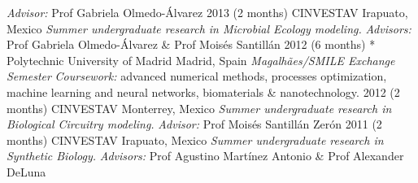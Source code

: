 \documentclass[]{friggeri-cv} %
\begin{document}
\begin{entrylist}
{\emph{Advisor:} Prof Gabriela Olmedo-Álvarez }%
\entry
{2013}
{(2 months)}
{CINVESTAV}
{Irapuato, Mexico}
{{\normalsize\emph{Summer undergraduate research in Microbial Ecology modeling.}}}
{\emph{Advisors:} Prof Gabriela Olmedo-Álvarez \& Prof Moisés Santillán }%
\entry
{2012}
{(6 months)}
{* Polytechnic University of Madrid}
{Madrid, Spain}
{{\normalsize\emph{Magalhães/SMILE Exchange Semester}}}
{\emph{Coursework:} advanced numerical methods, processes optimization, machine learning and neural networks, biomaterials \& nanotechnology.}
\entry
{2012}
{(2 months)}
{CINVESTAV}
{Monterrey, Mexico}
{{\normalsize\emph{Summer undergraduate research in Biological Circuitry modeling.}}}
{\emph{Advisor:} Prof Moisés Santillán Zerón }%
\entry
{2011}
{(2 months)}
{CINVESTAV}
{Irapuato, Mexico}
{{\normalsize\emph{Summer undergraduate research in Synthetic Biology.}}}
{\emph{Advisors:} Prof Agustino Martínez Antonio \& Prof Alexander DeLuna}%
\end{entrylist}
\end{document}
